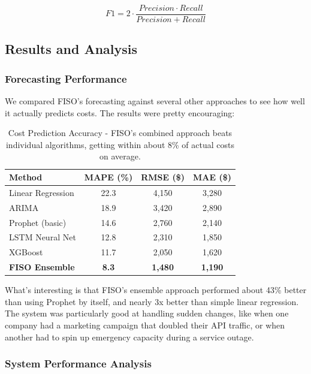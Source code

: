 \documentclass[conference]{IEEEtran}
\begin{document}
\begin{equation}
F1 = 2 \cdot \frac{Precision \cdot Recall}{Precision + Recall}
\end{equation}

\subsection{Results and Analysis}

\subsubsection{Forecasting Performance}

We compared FISO's forecasting against several other approaches to see how well it actually predicts costs. The results were pretty encouraging:

\begin{table}[h]
    \centering
    \begin{tabular}{@{}lccc@{}}
        \toprule
        \textbf{Method} & \textbf{MAPE (\%)} & \textbf{RMSE (\$)} & \textbf{MAE (\$)} \\
        \midrule
        Linear Regression & 22.3 & 4,150 & 3,280 \\
        ARIMA & 18.9 & 3,420 & 2,890 \\
        Prophet (basic) & 14.6 & 2,760 & 2,140 \\
        LSTM Neural Net & 12.8 & 2,310 & 1,850 \\
        XGBoost & 11.7 & 2,050 & 1,620 \\
        \textbf{FISO Ensemble} & \textbf{8.3} & \textbf{1,480} & \textbf{1,190} \\
        \bottomrule
    \end{tabular}
    \caption{Cost Prediction Accuracy - FISO's combined approach beats individual algorithms, getting within about 8\% of actual costs on average.}
    \label{tab:forecasting}
\end{table}

What's interesting is that FISO's ensemble approach performed about 43\% better than using Prophet by itself, and nearly 3x better than simple linear regression. The system was particularly good at handling sudden changes, like when one company had a marketing campaign that doubled their API traffic, or when another had to spin up emergency capacity during a service outage.

\subsubsection{System Performance Analysis}
\end{document}
